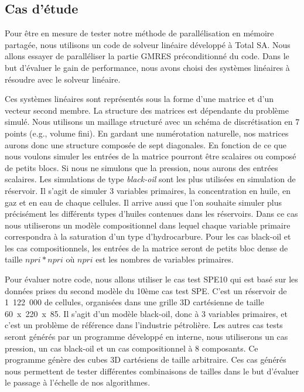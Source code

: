 \subsection{Cas d'étude}
Pour être en mesure de tester notre méthode de parallélisation en mémoire partagée, nous utilisons un code de solveur linéaire développé à Total SA.
%
Nous allons essayer de paralléliser la partie GMRES préconditionné du code.
%
Dans le but d'évaluer le gain de performance, nous avons choisi des systèmes linéaires à résoudre avec le solveur linéaire.


Ces systèmes linéaires sont représentés sous la forme d'une matrice et d'un vecteur second membre.
%
La structure des matrices est dépendante du problème simulé.
%
Nous utilisons un maillage structuré avec un schéma de discrétisation en 7 points (e.g., volume fini).
%
En gardant une numérotation naturelle, nos matrices aurons donc une structure composée de sept diagonales.
%
En fonction de ce que nous voulons simuler les entrées de la matrice pourront être scalaires ou composé de petits blocs.
%
Si nous ne simulons que la pression, nous aurons des entrées scalaires.
%
Les simulations de type {\em black-oil} sont les plus utilisées en simulation de réservoir.
%
Il s'agit de simuler 3 variables primaires, la concentration en huile, en gaz et en eau de chaque cellules.
%
Il arrive aussi que l'on souhaite simuler plus précisément les différents types d'huiles contenues dans les réservoirs.
%
Dans ce cas nous utiliserons un modèle compositionnel dans lequel chaque variable primaire correspondra à la saturation d'un type d'hydrocarbure.
%
Pour les cas black-oil et les cas compositionnels, les entrées de la matrice seront de petits bloc dense de taille $npri*npri$ où $npri$ est les nombres de variables primaires.



Pour évaluer notre code, nous allons utiliser le cas test SPE10 qui est basé sur les données prises du second modèle du 10ème cas test SPE\cite{SPE10}.
%
C'est un réservoir de 1~122~000 de cellules, organisées dans une grille 3D cartésienne de taille 60~x~220~x~85.
%
Il s'agit d'un modèle black-oil, donc à 3 variables primaires, et c'est un problème de référence dans l'industrie pétrolière.
%
Les autres cas tests seront générés par un programme développé en interne, nous utiliserons un cas pression, un cas black-oil et un cas compositionnel à 8 composants.
%
Ce programme génère des cubes 3D cartésiens de taille arbitraire.
%
Ces cas générés nous permettent de tester différentes combinaisons de tailles dans le but d'évaluer le passage à l'échelle de nos algorithmes.


